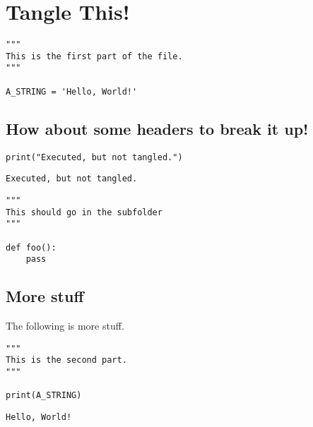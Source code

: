 \section{Tangle This!}


\begin{verbatim}"""
This is the first part of the file.
"""

A_STRING = 'Hello, World!'
\end{verbatim}



\subsection{How about some headers to break it up!}




\begin{verbatim}print("Executed, but not tangled.")
\end{verbatim}


\begin{verbatim}Executed, but not tangled.

\end{verbatim}



\begin{verbatim}"""
This should go in the subfolder
"""

def foo():
    pass

\end{verbatim}



\subsection{More stuff}




The following is more stuff.



\begin{verbatim}"""
This is the second part.
"""

print(A_STRING)
\end{verbatim}


\begin{verbatim}Hello, World!

\end{verbatim}


